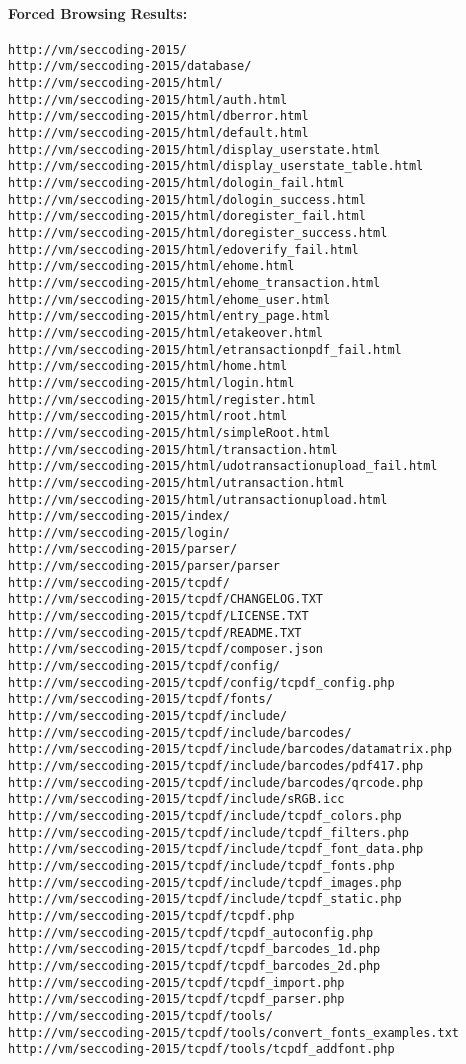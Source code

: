 \paragraph{Forced Browsing Results:}
\begin{verbatim}
http://vm/seccoding-2015/
http://vm/seccoding-2015/database/
http://vm/seccoding-2015/html/
http://vm/seccoding-2015/html/auth.html
http://vm/seccoding-2015/html/dberror.html
http://vm/seccoding-2015/html/default.html
http://vm/seccoding-2015/html/display_userstate.html
http://vm/seccoding-2015/html/display_userstate_table.html
http://vm/seccoding-2015/html/dologin_fail.html
http://vm/seccoding-2015/html/dologin_success.html
http://vm/seccoding-2015/html/doregister_fail.html
http://vm/seccoding-2015/html/doregister_success.html
http://vm/seccoding-2015/html/edoverify_fail.html
http://vm/seccoding-2015/html/ehome.html
http://vm/seccoding-2015/html/ehome_transaction.html
http://vm/seccoding-2015/html/ehome_user.html
http://vm/seccoding-2015/html/entry_page.html
http://vm/seccoding-2015/html/etakeover.html
http://vm/seccoding-2015/html/etransactionpdf_fail.html
http://vm/seccoding-2015/html/home.html
http://vm/seccoding-2015/html/login.html
http://vm/seccoding-2015/html/register.html
http://vm/seccoding-2015/html/root.html
http://vm/seccoding-2015/html/simpleRoot.html
http://vm/seccoding-2015/html/transaction.html
http://vm/seccoding-2015/html/udotransactionupload_fail.html
http://vm/seccoding-2015/html/utransaction.html
http://vm/seccoding-2015/html/utransactionupload.html
http://vm/seccoding-2015/index/
http://vm/seccoding-2015/login/
http://vm/seccoding-2015/parser/
http://vm/seccoding-2015/parser/parser
http://vm/seccoding-2015/tcpdf/
http://vm/seccoding-2015/tcpdf/CHANGELOG.TXT
http://vm/seccoding-2015/tcpdf/LICENSE.TXT
http://vm/seccoding-2015/tcpdf/README.TXT
http://vm/seccoding-2015/tcpdf/composer.json
http://vm/seccoding-2015/tcpdf/config/
http://vm/seccoding-2015/tcpdf/config/tcpdf_config.php
http://vm/seccoding-2015/tcpdf/fonts/
http://vm/seccoding-2015/tcpdf/include/
http://vm/seccoding-2015/tcpdf/include/barcodes/
http://vm/seccoding-2015/tcpdf/include/barcodes/datamatrix.php
http://vm/seccoding-2015/tcpdf/include/barcodes/pdf417.php
http://vm/seccoding-2015/tcpdf/include/barcodes/qrcode.php
http://vm/seccoding-2015/tcpdf/include/sRGB.icc
http://vm/seccoding-2015/tcpdf/include/tcpdf_colors.php
http://vm/seccoding-2015/tcpdf/include/tcpdf_filters.php
http://vm/seccoding-2015/tcpdf/include/tcpdf_font_data.php
http://vm/seccoding-2015/tcpdf/include/tcpdf_fonts.php
http://vm/seccoding-2015/tcpdf/include/tcpdf_images.php
http://vm/seccoding-2015/tcpdf/include/tcpdf_static.php
http://vm/seccoding-2015/tcpdf/tcpdf.php
http://vm/seccoding-2015/tcpdf/tcpdf_autoconfig.php
http://vm/seccoding-2015/tcpdf/tcpdf_barcodes_1d.php
http://vm/seccoding-2015/tcpdf/tcpdf_barcodes_2d.php
http://vm/seccoding-2015/tcpdf/tcpdf_import.php
http://vm/seccoding-2015/tcpdf/tcpdf_parser.php
http://vm/seccoding-2015/tcpdf/tools/
http://vm/seccoding-2015/tcpdf/tools/convert_fonts_examples.txt
http://vm/seccoding-2015/tcpdf/tools/tcpdf_addfont.php
\end{verbatim}

